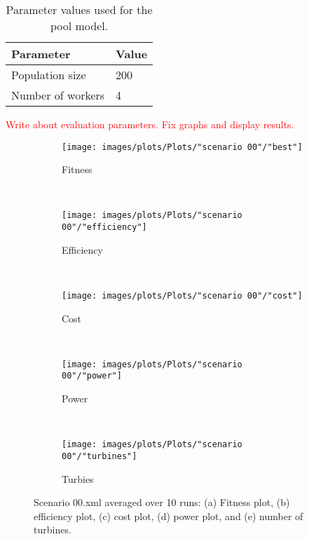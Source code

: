 \documentclass[12pt]{report}
\begin{document}
\begin{table}
\centering
\caption{Parameter values used for the pool model.}
\label{table:final parameter settings pool model}
\begin{tabular}{l|l}
\textbf{Parameter} & \textbf{Value} \\ 
\hline 
Population size & 200 \\  
Number of workers & 4 \\ 
\end{tabular}
\end{table}


\noindent \textcolor{red}{Write about evaluation parameters. Fix graphs and display results.}


\begin{figure}[h!]
    \centering
      \begin{subfigure}[b]{0.31\textwidth}
        \texttt{[image: images/plots/Plots/"scenario 00"/"best"]}
        \caption{Fitness}
        \hfill
        \label{plot:fitness plot scenario 00}
    \end{subfigure}
    ~
      \begin{subfigure}[b]{0.31\textwidth}
        \texttt{[image: images/plots/Plots/"scenario 00"/"efficiency"]}
        \caption{Efficiency}
        \hfill
        \label{plot:single point crossover}
    \end{subfigure}
    ~
    \begin{subfigure}[b]{0.31\textwidth}
        \texttt{[image: images/plots/Plots/"scenario 00"/"cost"]}
        \caption{Cost}
        \hfill
        \label{plot:single point crossover}
    \end{subfigure}
    ~
    \begin{subfigure}[b]{0.31\textwidth}
        \texttt{[image: images/plots/Plots/"scenario 00"/"power"]}
        \caption{Power}
        \hfill
        \label{plot:two point crossover}
    \end{subfigure}
    ~
    \begin{subfigure}[b]{0.31\textwidth}
        \texttt{[image: images/plots/Plots/"scenario 00"/"turbines"]}
        \caption{Turbies}
        \hfill
        \label{plot:uniform crossover}
    \end{subfigure}
    \caption{Scenario 00.xml averaged over 10 runs: (a) Fitness plot, (b) efficiency plot, (c) cost plot, (d) power plot, and (e) number of turbines.}
    \label{plot:master slave scenario 00}
\end{figure}
\end{document}
